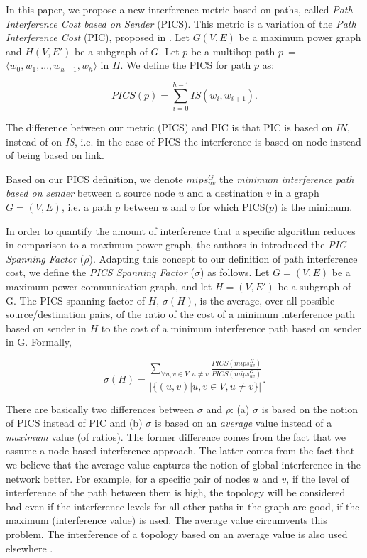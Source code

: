 \documentclass{llncs}
\begin{document}
In this paper, we propose a new interference metric based on paths, called \textit{Path Interference Cost based on Sender} (PICS). This metric is a variation
of the  \textit{Path Interference Cost} (PIC), proposed in \cite{blough2005}. 
Let $G(V,E)$ be a maximum power graph and $H(V,E')$ be a subgraph of $G$.
Let $p$ be a multihop path \mbox{$p$ = $\langle w_0,w_1, ..., w_{h-1}, w_{h} \rangle$} in $H$. We define the PICS for path
$p$ as:

\begin{equation}
\label{eq:new_pic}
  PICS(p) = \sum_{i = 0}^{h - 1}IS(w_i, w_{i+1}).
\end{equation}

The difference between our metric (PICS) and PIC \cite{blough2005} is that PIC is based on \textit{IN}, instead of on \textit{IS}, i.e. in the case of PICS 
the interference is based on node instead of being based on link.

Based on our PICS definition, we denote $mips^{G}_{uv}$ the \textit{minimum interference path based on sender} between a source node $u$ and a destination $v$ in a graph $G = (V,E)$,
i.e. a path $p$ between $u$ and $v$ for which PICS($p$) is the minimum. 

In order to quantify the amount of interference that a specific algorithm reduces in comparison to a maximum power graph, the authors in \cite{blough2005} introduced the
\textit{PIC Spanning Factor} ($\rho$). Adapting this concept to our definition of path interference cost, we define the \emph{PICS Spanning Factor} ($\sigma$) as follows.
Let $G = (V, E)$ be a maximum power communication graph, and let $H = (V, E')$ be a subgraph of G. The PICS spanning factor of $H$, $\sigma(H)$, is the average, 
over all possible source/destination pairs, of the ratio of the cost of a minimum interference path based on sender in $H$ to the cost of a minimum interference path based on sender in G. Formally,

\begin{equation}
\label{eq:new_spanning_factor}
  \sigma(H) = \frac{\sum_{\forall u,v \in V, u \not= v}\frac{PICS(mips^{H}_{uv})}{PICS(mips^{G}_{uv})}}{|\lbrace (u,v) | u,v \in V, u \not= v\rbrace |}.
\end{equation}

There are basically two differences between $\sigma$ and $\rho$: (a)  $\sigma$ is based on the notion of PICS instead of PIC and (b) $\sigma$ is based on an \textit{average} value instead of 
a \textit{maximum} value (of ratios). 
The former difference comes from the fact that we assume a node-based interference approach. The latter comes from the fact that we believe that 
the average value captures the notion of global interference in the network better. For example, for a specific pair of nodes $u$ and $v$, if the level of interference of the path between
them is high, the topology will be considered bad even if the interference levels for all other paths in the graph are good, if the maximum (interference value) is used. 
The average value circumvents this problem. 
The interference of a topology based on an average value is also used elsewhere \cite{johansson2005,Moaveni-nejad05,Banner2O08}.
  
\end{document}
